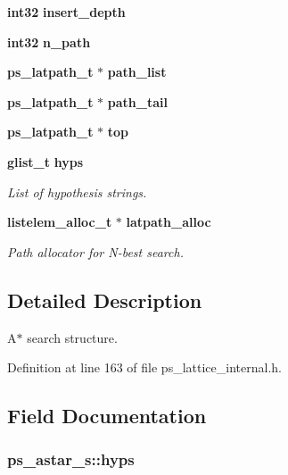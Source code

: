 \begin{DoxyCompactItemize}
\item 
{\bf int32} {\bfseries insert\-\_\-depth}\label{structps__astar__s_a50798b1396b3f565b2584ffeb1245b5d}

\item 
{\bf int32} {\bfseries n\-\_\-path}\label{structps__astar__s_a12ba7d143c867b1f1e55dfdfae3e6236}

\item 
{\bf ps\-\_\-latpath\-\_\-t} $\ast$ {\bfseries path\-\_\-list}\label{structps__astar__s_a4474da488f4e1545d395c65c39679b8c}

\item 
{\bf ps\-\_\-latpath\-\_\-t} $\ast$ {\bfseries path\-\_\-tail}\label{structps__astar__s_abbfec3e490a6bfd56b75ec419ad9f058}

\item 
{\bf ps\-\_\-latpath\-\_\-t} $\ast$ {\bfseries top}\label{structps__astar__s_aa995e464c2df2594824602e55afb25a8}

\item 
{\bf glist\-\_\-t} {\bf hyps}
\begin{DoxyCompactList}\small\item\em \-List of hypothesis strings. \end{DoxyCompactList}\item 
{\bf listelem\-\_\-alloc\-\_\-t} $\ast$ {\bf latpath\-\_\-alloc}
\begin{DoxyCompactList}\small\item\em \-Path allocator for \-N-\/best search. \end{DoxyCompactList}\end{DoxyCompactItemize}


\subsection{\-Detailed \-Description}
\-A$\ast$ search structure. 

\-Definition at line 163 of file ps\-\_\-lattice\-\_\-internal.\-h.



\subsection{\-Field \-Documentation}
\subsubsection[{hyps}]{ {\bf ps\-\_\-astar\-\_\-s\-::hyps}}\label{structps__astar__s_ace603617a74a81575519ae1bb94720c4}


